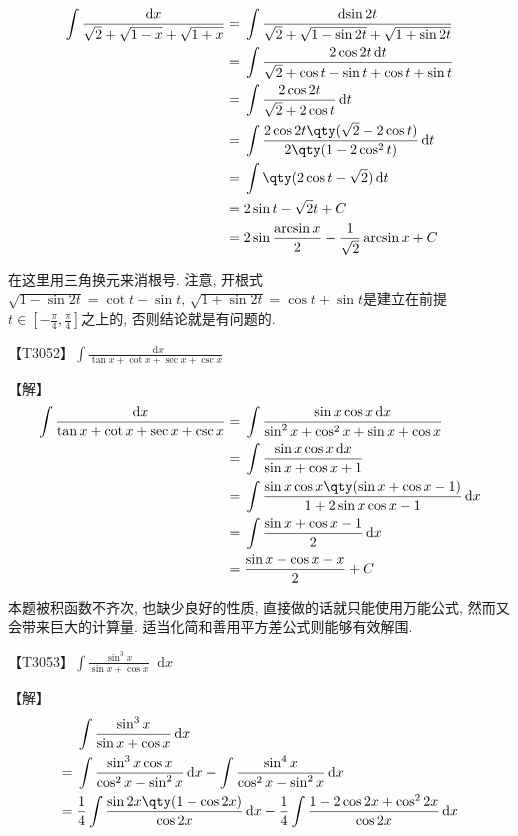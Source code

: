 \documentclass{ctexbook}
\newcommand*{\dif}{\mathop{}\!\mathrm{d}}
\begin{document}
{\begin{align*}
\int\frac{\dif{x}}{\sqrt{2}+\sqrt{1-x}+\sqrt{1+x}}={}&\int\frac{\dif{\sin{2t}}}{\sqrt{2}+\sqrt{1-\sin{2t}}+\sqrt{1+\sin{2t}}}\\
={}&\int\frac{2\cos{2t}\dif{t}}{\sqrt{2}+\cos{t}-\sin{t}+\cos{t}+\sin{t}}\\
={}&\int\frac{2\cos{2t}}{\sqrt{2}+2\cos{t}}\dif{t}\\
={}&\int\frac{2\cos{2t}\qty(\sqrt{2}-2\cos{t})}{2\qty(1-2\cos^{2}{t})}\dif{t}\\
={}&\int\qty(2\cos{t}-\sqrt{2})\dif{t}\\
={}&2\sin{t}-\sqrt{2}t+C\\
={}&2\sin{\frac{\arcsin{x}}{2}}-\frac{1}{\sqrt{2}}\arcsin{x}+C
\end{align*}\par
{\kaishu 在这里用三角换元来消根号. 注意, 开根式$\sqrt{1-\sin{2t}}=\cot{t}-\sin{t},\,\sqrt{1+\sin{2t}}=\cos{t}+\sin{t}$是建立在前提$t\in\left[-\frac{\pi}{4},\frac{\pi}{4}\right]$之上的, 否则结论就是有问题的. \par}
{\color{red}【T3052】}$\int\frac{\dif{x}}{\tan{x}+\cot{x}+\sec{x}+\csc{x}}$\par
【解】
\begin{align*}
\int\frac{\dif{x}}{\tan{x}+\cot{x}+\sec{x}+\csc{x}}={}&\int\frac{\sin{x}\cos{x}\dif{x}}{\sin^{2}{x}+\cos^{2}{x}+\sin{x}+\cos{x}}\\
={}&\int\frac{\sin{x}\cos{x}\dif{x}}{\sin{x}+\cos{x}+1}\\
={}&\int\frac{\sin{x}\cos{x}\qty(\sin{x}+\cos{x}-1)}{1+2\sin{x}\cos{x}-1}\dif{x}\\
={}&\int\frac{\sin{x}+\cos{x}-1}{2}\dif{x}\\
={}&\frac{\sin{x}-\cos{x}-x}{2}+C
\end{align*}\par
{\kaishu 本题被积函数不齐次, 也缺少良好的性质, 直接做的话就只能使用万能公式, 然而又会带来巨大的计算量. 适当化简和善用平方差公式则能够有效解围. \par}
{\color{red}【T3053】}$\int\frac{\sin^{3}{x}}{\sin{x}+\cos{x}}\dif{x}$\par
【解】
\begin{align*}
{}&\int\frac{\sin^{3}{x}}{\sin{x}+\cos{x}}\dif{x}\\
={}&\int\frac{\sin^{3}{x}\cos{x}}{\cos^{2}{x}-\sin^{2}{x}}\dif{x}-\int\frac{\sin^{4}{x}}{\cos^{2}{x}-\sin^{2}{x}}\dif{x}\\
={}&\frac{1}{4}\int\frac{\sin{2x}\qty(1-\cos{2x})}{\cos{2x}}\dif{x}-\frac{1}{4}\int\frac{1-2\cos{2x}+\cos^{2}{2x}}{\cos{2x}}\dif{x}\\

\end{align*}}
\end{document}
